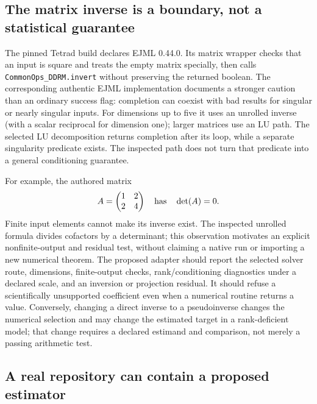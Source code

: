 \subsection{The matrix inverse is a boundary, not a statistical guarantee}

The pinned Tetrad build declares EJML 0.44.0. Its matrix wrapper checks that an input is square and treats the empty matrix specially, then calls \texttt{CommonOps\_DDRM.invert} without preserving the returned boolean. The corresponding authentic EJML implementation documents a stronger caution than an ordinary success flag: completion can coexist with bad results for singular or nearly singular inputs. For dimensions up to five it uses an unrolled inverse (with a scalar reciprocal for dimension one); larger matrices use an LU path. The selected LU decomposition returns completion after its loop, while a separate singularity predicate exists. The inspected path does not turn that predicate into a general conditioning guarantee.~\citep{exec25_javaiv_tetrad,exec25_javaiv_ejml}

For example, the authored matrix
\[
 A=\begin{pmatrix}1&2\\2&4\end{pmatrix}
 \quad\hbox{has}\quad \det(A)=0.
\]
Finite input elements cannot make its inverse exist. The inspected unrolled formula divides cofactors by a determinant; this observation motivates an explicit nonfinite-output and residual test, without claiming a native run or importing a new numerical theorem. The proposed adapter should report the selected solver route, dimensions, finite-output checks, rank/conditioning diagnostics under a declared scale, and an inversion or projection residual. It should refuse a scientifically unsupported coefficient even when a numerical routine returns a value. Conversely, changing a direct inverse to a pseudoinverse changes the numerical selection and may change the estimated target in a rank-deficient model; that change requires a declared estimand and comparison, not merely a passing arithmetic test.~\citep{exec25_javaiv_ejml,exec25_javaiv_choice}

\subsection{A real repository can contain a proposed estimator}

